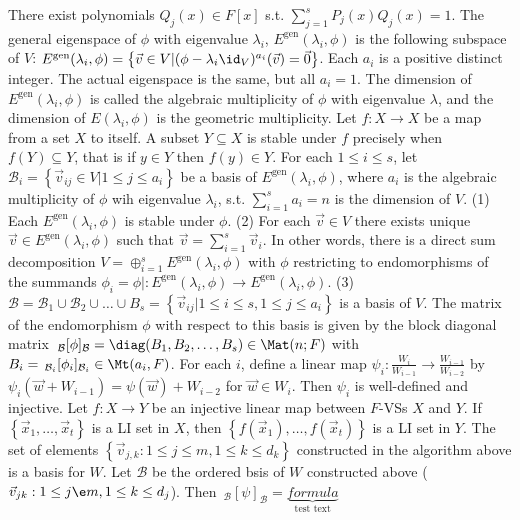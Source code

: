  There exist polynomials $Q_j(x) \in F[x]$ s.t. $\sum_{j=1}^sP_j(x)Q_j(x) = 1$.
 The general eigenspace of $\phi$ with eigenvalue $\lambda_i$, $E^{\mathrm{gen}}(\lambda_i, \phi)$ is the following subspace of $V$: $E^{\mathrm{gen}}(\lambda_i, \phi) = \left\{ \vec{v} \in V | (\phi - \lambda_i \id_V)^{a_i}(\vec{v}) = \vec{0} \right\}$. Each $a_i$ is a positive distinct integer. The actual eigenspace is the same, but all $a_i=1$. The dimension of $E^\mathrm{gen} (\lambda_i, \phi)$ is called the algebraic multiplicity of $\phi$ with eigenvalue $\lambda$, and the dimension of $E(\lambda_i, \phi)$ is the geometric multiplicity. 
 Let $f : X \to X$ be a map from a set $X$ to itself. A subset $Y \subseteq X$ is stable under $f$ precisely when $f(Y) \subseteq Y$, that is if $y \in Y$ then $f(y) \in Y$.
 For each $1 \le i \le s$, let $\mathcal{B}_i = \left\{ \vec{v}_{ij} \in V | 1 \le j \le a_i \right\}$ be a basis of $E^{\mathrm{gen}}(\lambda_i, \phi)$, where $a_i$ is the algebraic multiplicity of $\phi$ wih eigenvalue $\lambda_i$, s.t. $\sum_{i=1}^s a_i = n$ is the dimension of $V$.
(1) Each $E^\mathrm{gen} (\lambda_i, \phi)$ is stable under $\phi$.
(2) For each $\vec{v} \in V$ there exists unique $\vec{v} \in E^\mathrm{gen} (\lambda_i, \phi)$ such that $\vec{v} = \sum_{i=1}^s \vec{v}_i$. In other words, there is a direct sum decomposition $V = \oplus_{i=1}^s E^\mathrm{gen} (\lambda_i, \phi)$ with $\phi$ restricting to endomorphisms of the summands $\phi_i = \phi| : E^\mathrm{gen} (\lambda_i, \phi) \to E^\mathrm{gen} (\lambda_i, \phi)$.
(3) $\mathcal{B} = \mathcal{B}_1 \cup \mathcal{B}_2 \cup \dots \cup B_s = \left\{ \vec{v}_{ij} | 1 \le i \le s, 1 \le j \le a_i \right\}$ is a basis of $V$. The matrix of the endomorphism $\phi$ with respect to this basis is given by the block diagonal matrix $\,_{\mathcal{B}}[\phi]_{\mathcal{B}} = \diag(B_1, B_2, \dots, B_s) \in \Mat(n; F)$ with $B_i = \,_{\mathcal{B}_i}[\phi_i]_{\mathcal{B}_i} \in \Mt(a_i, F)$.
 For each $i$, define a linear map $\psi_i : \frac{W_i}{W_{i-1}} \to \frac{W_{i-1}}{W_{i-2}}$ by $\psi_i(\vec{w} + W_{i-1}) = \psi(\vec{w}) + W_{i-2}$ for $\vec{w} \in W_i$. Then $\psi_i$ is well-defined and injective.
 Let $f : X \to Y$ be an injective linear map between $F$-VSs $X$ and $Y$. If $\left\{ \vec{x}_1, \dots, \vec{x}_t \right\}$ is a LI set in $X$, then $\left\{ f(\vec{x}_1), \dots, f(\vec{x}_t) \right\}$ is a LI set in $Y$.
 The set of elements $\left\{ \vec{v}_{j,k} : 1 \le j \le m, 1 \le k \le d_k \right\}$ constructed in the algorithm above is a basis for $W$.
 Let $\mathcal{B}$ be the ordered bsis of $W$ constructed above ($\vec{v}_{jk} : 1 \le j \e m, 1 \le k \le d_j$). Then
$\,_{\mathcal{B}}[\psi]_{\mathcal{B}} = \underbrace{formula}_{\text{test text}}$